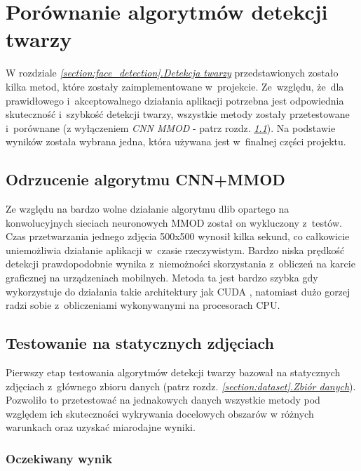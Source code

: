 \newpage

\section{Porównanie algorytmów detekcji twarzy}

W rozdziale \hyperref[{section:face_detection}]{\textit{\ref{section:face_detection}.Detekcja twarzy}} przedstawionych zostało kilka metod, które zostały zaimplementowane w~projekcie. Ze~względu, że~dla prawidłowego i~akceptowalnego działania aplikacji potrzebna jest odpowiednia skuteczność i~szybkość detekcji twarzy, wszystkie metody zostały przetestowane i~porównane (z wyłączeniem \textit{CNN MMOD} - patrz rozdz. \hyperref[{section:no_cnn}]{\textit{\ref{section:no_cnn}}}). Na podstawie wyników została wybrana jedna, która używana jest w~finalnej części projektu.


\subsection{Odrzucenie algorytmu CNN+MMOD} \label{section:no_cnn}

Ze względu na bardzo wolne działanie algorytmu dlib opartego na konwolucyjnych sieciach neuronowych MMOD został on wykluczony z~testów. Czas przetwarzania jednego zdjęcia 500x500 wynosił kilka sekund, co całkowicie uniemożliwia działanie aplikacji w~czasie rzeczywistym. Bardzo niska prędkość detekcji prawdopodobnie wynika z~niemożności skorzystania z~obliczeń na karcie graficznej na urządzeniach mobilnych. Metoda ta jest bardzo szybka gdy wykorzystuje do działania takie architektury jak CUDA \cite{nvidia_cuda}, natomiast dużo gorzej radzi sobie z~obliczeniami wykonywanymi na procesorach CPU.

\subsection{Testowanie na statycznych zdjęciach}

Pierwszy etap testowania algorytmów detekcji twarzy bazował na statycznych zdjęciach z~głównego zbioru danych (patrz rozdz. \hyperref[section:dataset]{\textit{\ref{section:dataset}.Zbiór danych}}). Pozwoliło to przetestować na jednakowych danych wszystkie metody pod względem ich skuteczności wykrywania docelowych obszarów w różnych warunkach oraz uzyskać miarodajne wyniki.

\subsubsection{Oczekiwany wynik}

